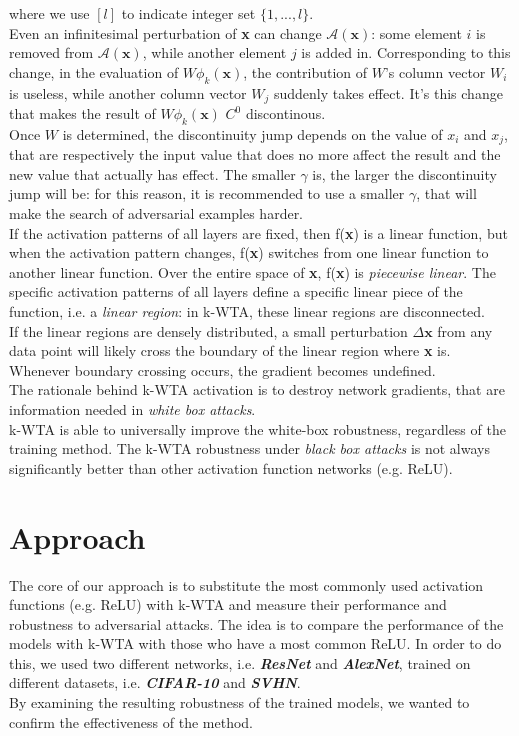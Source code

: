 \documentclass[a4paper]{article}
\begin{document}
	where we use $[l]$ to indicate integer set $\{1,...,l\}$.\\
	Even an infinitesimal perturbation of \textbf{x} can change $\mathcal{A}(\textbf{x})$: some element $i$ is removed from $\mathcal{A}(\textbf{x})$, while another element $j$ is added in. Corresponding to this change, in the evaluation of $W\phi_{k}(\textbf{x})$, the contribution of $W$'s column vector $W_{i}$ is useless, while another column vector $W_{j}$ suddenly takes effect. It's this change that makes the result of $W\phi_{k}(\textbf{x})$ $C^0$ discontinous.\\
	Once $W$ is determined, the discontinuity jump depends on the value of $x_i$ and $x_j$, that are respectively the input value that does no more affect the result and the new value that actually has effect. The smaller $\gamma$ is, the larger the discontinuity jump will be: for this reason, it is recommended to use a smaller $\gamma$, that will make the search of adversarial examples harder.\\
	If the activation patterns of all layers are fixed, then f(\textbf{x}) is a linear function, but when the activation pattern changes, f(\textbf{x}) switches from one linear function to another linear function. Over the entire space of \textbf{x}, f(\textbf{x}) is \emph{piecewise linear}. The specific activation patterns of all layers define a specific linear piece of the function, i.e. a \emph{linear region}: in k-WTA, these linear regions are disconnected.\\
	If the linear regions are densely distributed, a small perturbation $\Delta\textbf{x}$ from any data point will likely cross the boundary of the linear region where \textbf{x} is. Whenever boundary crossing occurs, the gradient becomes undefined.\\
	The rationale behind k-WTA activation is to destroy network gradients, that are information needed in \emph{white box attacks}.\\
	k-WTA is able to universally improve the white-box robustness, regardless of the training method. The k-WTA robustness under \emph{black box attacks} is not always significantly better than other activation function networks (e.g. ReLU).
	
	\section{Approach}
	The core of our approach is to substitute the most commonly used activation functions (e.g. ReLU) with k-WTA and measure their performance and robustness to adversarial attacks.
	The idea is to compare the performance of the models with k-WTA with those who have a most common ReLU.
	In order to do this, we used two different networks, i.e. \textbf{\textit{ResNet}} and \textbf{\textit{AlexNet}}, trained on different datasets, i.e. \textbf{\textit{CIFAR-10}} and \textbf{\textit{SVHN}}.\\
	By examining the resulting robustness of the trained models, we wanted to confirm the effectiveness of the method.
	
\end{document}
